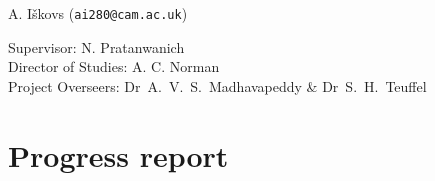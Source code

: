 \documentclass[12pt,a4]{article}
\begin{document}
\begin{center}

A. I\v{s}kovs (\texttt{ai280@cam.ac.uk})

\vspace{0.3in}
\textbf{}
\vspace{0.4in}

Supervisor: N. Pratanwanich\\
Director of Studies: A. C. Norman\\
Project Overseers: Dr~A.~V.~S.~Madhavapeddy  \& Dr~S.~H.~Teuffel\\

\end{center}


\section*{Progress report}
\end{document}
